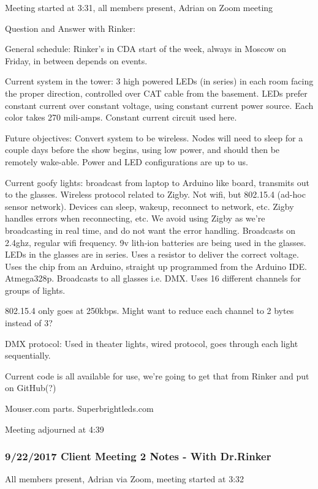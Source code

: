 \documentclass[12pt]{article}
\begin{document}
	Meeting started at 3:31, all members present, Adrian on Zoom meeting

Question and Answer with Rinker:

General schedule: Rinker's in CDA start of the week, always in Moscow on Friday, in between depends on events.

Current system in the tower: 3 high powered LEDs (in series) in each room facing the proper direction, controlled over CAT cable from the basement. LEDs prefer constant current over constant voltage, using constant current power source. Each color takes 270 mili-amps. Constant current circuit used here.

Future objectives: Convert system to be wireless. Nodes will need to sleep for a couple days before the show begins, using low power, and should then be remotely wake-able. Power and LED configurations are up to us.

Current goofy lights: broadcast from laptop to Arduino like board, transmits out to the glasses. Wireless protocol related to Zigby. Not wifi, but 802.15.4 (ad-hoc sensor network). Devices can sleep, wakeup, reconnect to network, etc. Zigby handles errors when reconnecting, etc. We avoid using Zigby as we’re broadcasting in real time, and do not want the error handling. Broadcasts on 2.4ghz, regular wifi frequency. 9v lith-ion batteries are being used in the glasses. LEDs in the glasses are in series. Uses a resistor to deliver the correct voltage. Uses the chip from an Arduino, straight up programmed from the Arduino IDE. Atmega328p. Broadcasts to all glasses i.e. DMX. Uses 16 different channels for groups of lights.

802.15.4 only goes at 250kbps. Might want to reduce each channel to 2 bytes instead of 3?

DMX protocol: Used in theater lights, wired protocol, goes through each light sequentially.

Current code is all available for use, we're going to get that from Rinker and put on GitHub(?)

Mouser.com parts. Superbrightleds.com	

Meeting adjourned at 4:39

	\clearpage
	\subsubsection{9/22/2017 Client Meeting 2 Notes - With Dr.Rinker}
	All members present, Adrian via Zoom, meeting started at 3:32
\end{document}
